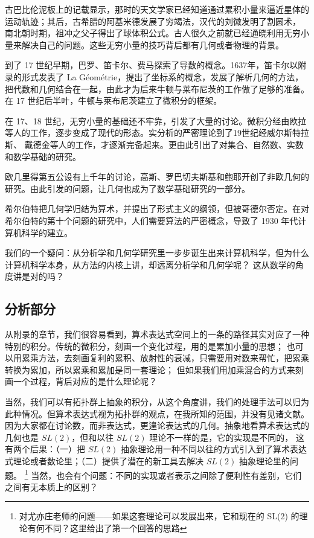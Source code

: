 \documentclass[a4paper,12pt]{article}
\numberwithin{problem}{section}
\numberwithin{definition}{section}
\numberwithin{lemma}{section}
\numberwithin{proposition}{section}
\numberwithin{theorem}{section}
\numberwithin{grammar}{section}
\numberwithin{program}{section}
\numberwithin{convention}{section}
\numberwithin{corollary}{section}
\begin{document}
古巴比伦泥板上的记载显示，那时的天文学家已经知道通过累积小量来逼近星体的运动轨迹；其后，古希腊的阿基米德发展了穷竭法，汉代的刘徽发明了割圆术，
南北朝时期，祖冲之父子得出了球体积公式。古人很久之前就已经通晓利用无穷小量来解决自己的问题。这些无穷小量的技巧背后都有几何或者物理的背景。

到了 17 世纪早期，巴罗、笛卡尔、费马探索了导数的概念。1637年，笛卡尔以附录的形式发表了 La Géométrie，提出了坐标系的概念，发展了解析几何的方法，
把代数和几何结合在一起，由此才为后来牛顿与莱布尼茨的工作做了足够的准备。在 17 世纪后半叶，牛顿与莱布尼茨建立了微积分的框架。

在 17、18 世纪，无穷小量的基础还不牢靠，引发了大量的讨论。微积分经由欧拉等人的工作，逐步变成了现代的形态。实分析的严密理论到了19世纪经威尔斯特拉斯、
戴德金等人的工作，才逐渐完备起来。更由此引出了对集合、自然数、实数和数学基础的研究。

欧几里得第五公设有上千年的讨论，高斯、罗巴切夫斯基和鲍耶开创了非欧几何的研究。由此引发的问题，让几何也成为了数学基础研究的一部分。

希尔伯特把几何学归结为算术，并提出了形式主义的纲领，但被哥德尔否定。在对希尔伯特的第十个问题的研究中，人们需要算法的严密概念，导致了 1930 年代计算机科学的建立。

我们的一个疑问：从分析学和几何学研究里一步步诞生出来计算机科学，但为什么计算机科学本身，从方法的内核上讲，却远离分析学和几何学呢？
这从数学的角度讲是对的吗？

\subsection{分析部分}

从附录的章节，我们很容易看到，算术表达式空间上的一条的路径其实对应了一种特别的积分。传统的微积分，刻画一个变化过程，用的是累加小量的思想；
也可以用累乘方法，去刻画复利的累积、放射性的衰减，只需要用对数来帮忙，把累乘转换为累加，所以累乘和累加是同一套理论；
但如果我们用加乘混合的方式来刻画一个过程，背后对应的是什么理论呢？

当然，我们可以有拓扑群上抽象的积分，从这个角度讲，我们的处理手法可以归为此种情况。但算术表达式视为拓扑群的观点，在我所知的范围，并没有见诸文献。
因为大家都在讨论数，而非表达式，更遑论表达式的几何。抽象地看算术表达式的几何也是 $SL(2)$，但和以往 $SL(2)$ 理论不一样的是，它的实现是不同的，
这有两个后果：（一）把 $SL(2)$ 抽象理论用一种不同以往的方式引入到了算术表达式理论或者数论里；（二）提供了潜在的新工具去解决 $SL(2)$ 抽象理论里的问题。
\footnote{对尤亦庄老师的问题——如果这套理论可以发展出来，它和现在的 SL(2) 的理论有何不同？这里给出了第一个回答的思路}
当然，也会有个问题：不同的实现或者表示之间除了便利性有差别，它们之间有无本质上的区别？
\end{document}
